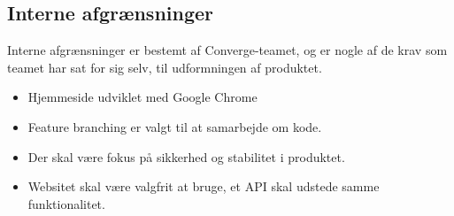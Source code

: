 \subsection{Interne afgrænsninger}

Interne afgrænsninger er bestemt af Converge-teamet, og er nogle af de krav som teamet har sat for sig selv, til udformningen af produktet.

\begin{itemize}
  \item Hjemmeside udviklet med Google Chrome
  \item Feature branching er valgt til at samarbejde om kode.
  \item Der skal være fokus på sikkerhed og stabilitet i produktet.
  \item Websitet skal være valgfrit at bruge, et API skal udstede samme funktionalitet.
\end{itemize}